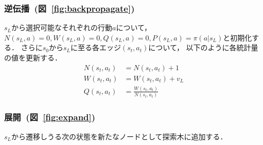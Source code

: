 \subsubsection*{逆伝播~(図~\ref{fig:backpropagate})}
$s_L$から選択可能なそれぞれの行動$a$について， $N(s_L, a)=0, W(s_L, a)=0, Q(s_L, a)=0, P(s_L, a)=\pi(a|s_L)$と初期化する．
さらに$s_0$から$s_L$に至る各エッジ$(s_t,a_t)$について， 以下のように各統計量の値を更新する．
\begin{align*}
  N(s_t, a_t) &= N(s_t, a_t)+1 \\
  W(s_t, a_t) &= W(s_t, a_t) + v_L \\
  Q(s_t, a_t) &= \frac{W(s_t,a_t)}{N(s_t,a_t)}
\end{align*}

\subsubsection*{展開~(図~\ref{fig:expand})}
$s_L$から遷移しうる次の状態を新たなノードとして探索木に追加する．

